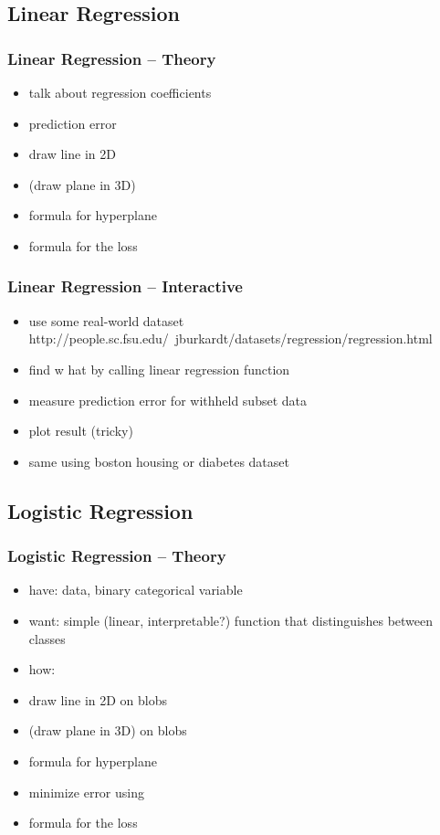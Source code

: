 \documentclass[english,final,compress]{beamer}
\begin{document}
\subsection{Linear Regression}

\begin{frame}
    \frametitle{Linear Regression -- Theory}
    \begin{itemize}
        \item talk about regression coefficients
        \item  prediction error
        \item  draw line in 2D
        \item  (draw plane in 3D)
        \item  formula for hyperplane
        \item  formula for the loss
    \end{itemize}
\end{frame}

\begin{frame}
    \frametitle{Linear Regression -- Interactive}
    \begin{itemize}
        \item  use some real-world dataset
            http://people.sc.fsu.edu/~jburkardt/datasets/regression/regression.html
        \item  find w hat by calling linear regression function
        \item  measure prediction error for withheld subset data
        \item  plot result (tricky)
        \item  same using boston housing or diabetes dataset
    \end{itemize}
\end{frame}

\subsection{Logistic Regression}

\begin{frame}
    \frametitle{Logistic Regression -- Theory}
    \begin{itemize}
        \item have: data, binary categorical variable
        \item  want: simple (linear, interpretable?) function that distinguishes between classes 
        \item  how:
        \item  draw line in 2D on blobs
        \item  (draw plane in 3D) on blobs
        \item  formula for hyperplane
        \item  minimize error using
        \item  formula for the loss
    \end{itemize}
\end{frame}
\end{document}
